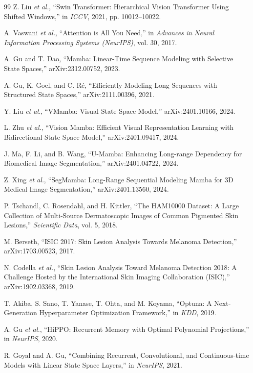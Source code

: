 \documentclass[conference]{IEEEtran}
\begin{document}
\begin{thebibliography}{99}
Z. Liu \emph{et al.}, ``Swin Transformer: Hierarchical Vision Transformer Using Shifted Windows,'' in \emph{ICCV}, 2021, pp. 10012–10022.

A. Vaswani \emph{et al.}, ``Attention is All You Need,'' in \emph{Advances in Neural Information Processing Systems (NeurIPS)}, vol. 30, 2017.

A. Gu and T. Dao, ``Mamba: Linear-Time Sequence Modeling with Selective State Spaces,'' arXiv:2312.00752, 2023.

A. Gu, K. Goel, and C. Ré, ``Efficiently Modeling Long Sequences with Structured State Spaces,'' arXiv:2111.00396, 2021.

Y. Liu \emph{et al.}, ``VMamba: Visual State Space Model,'' arXiv:2401.10166, 2024.

L. Zhu \emph{et al.}, ``Vision Mamba: Efficient Visual Representation Learning with Bidirectional State Space Model,'' arXiv:2401.09417, 2024.

J. Ma, F. Li, and B. Wang, ``U-Mamba: Enhancing Long-range Dependency for Biomedical Image Segmentation,'' arXiv:2401.04722, 2024.

Z. Xing \emph{et al.}, ``SegMamba: Long-Range Sequential Modeling Mamba for 3D Medical Image Segmentation,'' arXiv:2401.13560, 2024.

P. Tschandl, C. Rosendahl, and H. Kittler, ``The HAM10000 Dataset: A Large Collection of Multi-Source Dermatoscopic Images of Common Pigmented Skin Lesions,'' \emph{Scientific Data}, vol. 5, 2018.

M. Berseth, ``ISIC 2017: Skin Lesion Analysis Towards Melanoma Detection,'' arXiv:1703.00523, 2017.

N. Codella \emph{et al.}, ``Skin Lesion Analysis Toward Melanoma Detection 2018: A Challenge Hosted by the International Skin Imaging Collaboration (ISIC),'' arXiv:1902.03368, 2019.

T. Akiba, S. Sano, T. Yanase, T. Ohta, and M. Koyama, ``Optuna: A Next-Generation Hyperparameter Optimization Framework,'' in \emph{KDD}, 2019.

A. Gu \emph{et al.}, ``HiPPO: Recurrent Memory with Optimal Polynomial Projections,'' in \emph{NeurIPS}, 2020.

R. Goyal and A. Gu, ``Combining Recurrent, Convolutional, and Continuous-time Models with Linear State Space Layers,'' in \emph{NeurIPS}, 2021.

\end{thebibliography}
\end{document}
